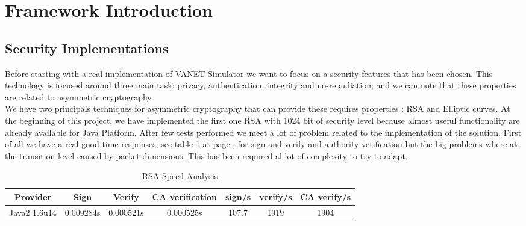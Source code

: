 \section{Framework Introduction}
\subsection{Security Implementations}
Before starting with  a real implementation of VANET Simulator we want to focus on a security features  that has been chosen. This technology is focused around three main task: privacy, authentication, integrity and no-repudiation; and we can note that these properties are related to asymmetric cryptography.\\ 
We have two  principals techniques for asymmetric cryptography that can provide these requires properties : RSA and Elliptic curves. At the beginning of this project, we have implemented the first one RSA with 1024 bit of security level because almost useful functionality are already available for Java Platform. After few tests performed we meet a lot of problem related to the implementation of the solution. First of all we have a  real good time responses, see table \ref{tab:RSAVelocity} at page \pageref{tab:RSAVelocity}, for sign and verify and authority verification but the big problems where at the transition level caused by packet dimensions. This has been required al lot of complexity to try to adapt.

\begin{table}[!ht]
	\centering
	\caption{RSA Speed Analysis}
	\begin{tabular}{|c|c|c|c|c|c|c|}
	\hline\hline 
	\textbf{Provider} & \textbf{Sign} & \textbf{Verify} & \textbf{CA verification} & \textbf{sign/s} & \textbf{verify/s}  & \textbf{CA verify/s}\\
	\hline
	Java2 1.6u14 & 0.009284s & 0.000521s & 0.000525s & 107.7 & 1919 & 1904 \\
	\hline
	\hline     %
 	\end{tabular} 
	\label{tab:RSAVelocity}
\end{table}
